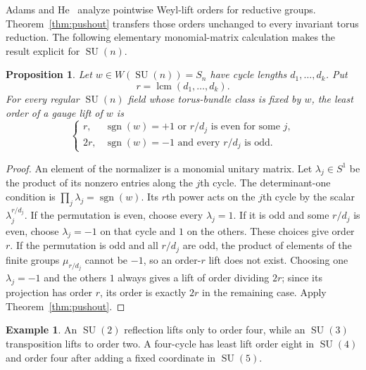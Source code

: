 \documentclass[11pt]{amsart}
\newcommand{\SU}{\operatorname{SU}}
\theoremstyle{plain}
\newtheorem{proposition}[theorem]{Proposition}
\theoremstyle{definition}
\newtheorem{example}[theorem]{Example}
\theoremstyle{remark}
\begin{document}
Adams and He~\cite{AdamsHe} analyze pointwise Weyl-lift orders for reductive groups. Theorem~\ref{thm:pushout} transfers those orders unchanged to every invariant torus reduction. The following elementary monomial-matrix calculation makes the result explicit for $\SU(n)$.

\begin{proposition}\label{prop:cycles}
Let $w\in W(\SU(n))=S_n$ have cycle lengths $d_1,\ldots,d_k$. Put
\[
 r=\operatorname{lcm}(d_1,\ldots,d_k).
\]
For every regular $\SU(n)$ field whose torus-bundle class is fixed by $w$, the least order of a gauge lift of $w$ is
\[
 \begin{cases}
 r,&\operatorname{sgn}(w)=+1\text{ or }r/d_j\text{ is even for some }j,\\
 2r,&\operatorname{sgn}(w)=-1\text{ and every }r/d_j\text{ is odd}.
 \end{cases}
\]
\end{proposition}

\begin{proof}
An element of the normalizer is a monomial unitary matrix. Let $\lambda_j\in S^1$ be the product of its nonzero entries along the $j$th cycle. The determinant-one condition is
$\prod_j\lambda_j=\operatorname{sgn}(w)$. Its $r$th power acts on the $j$th cycle by the scalar $\lambda_j^{r/d_j}$. If the permutation is even, choose every $\lambda_j=1$. If it is odd and some $r/d_j$ is even, choose $\lambda_j=-1$ on that cycle and $1$ on the others. These choices give order $r$. If the permutation is odd and all $r/d_j$ are odd, the product of elements of the finite groups $\mu_{r/d_j}$ cannot be $-1$, so an order-$r$ lift does not exist. Choosing one $\lambda_j=-1$ and the others $1$ always gives a lift of order dividing $2r$; since its projection has order $r$, its order is exactly $2r$ in the remaining case. Apply Theorem~\ref{thm:pushout}.
\end{proof}

\begin{example}
An $\SU(2)$ reflection lifts only to order four, while an $\SU(3)$
transposition lifts to order two. A four-cycle has least lift order
eight in $\SU(4)$ and order four after adding a fixed coordinate in
$\SU(5)$.
\end{example}


\enlargethispage{3\baselineskip}
\end{document}
